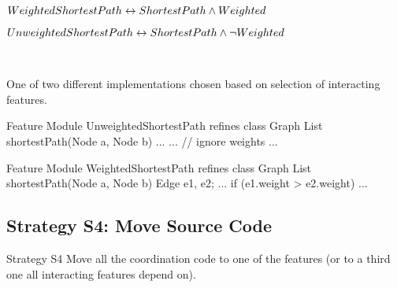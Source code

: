 \begin{frame}[fragile]{\myframetitle}
	\begin{fancycolumns}[widths={55},animation=none]
		{\centering\small

		$WeightedShortestPath \leftrightarrow ShortestPath \wedge Weighted$

		$UnweightedShortestPath \leftrightarrow ShortestPath \wedge \neg Weighted$

		}~
		\begin{note}{}
			One of two different implementations chosen based on selection of interacting features.
		\end{note}
	\nextcolumn
\begin{codetight}{Feature Module UnweightedShortestPath}
refines class Graph {
	List shortestPath(Node a, Node b){
		...
		...
		// ignore weights
		... 
	}
}
\end{codetight}
\begin{codetight}{Feature Module WeightedShortestPath}
refines class Graph {
	List shortestPath(Node a, Node b){
		Edge e1, e2;
		...
		if (e1.weight > e2.weight) 
		... 
	}
}
\end{codetight}	
	\end{fancycolumns}
\end{frame}

\subsection{Strategy S4: Move Source Code}

\begin{frame}{\myframetitle}
	\begin{fancycolumns}[widths={30},animation=none]
		\begin{definition}{Strategy S4}
			Move all the coordination code to one of the features (or to a third one all interacting features depend on).
		\end{definition}
	\nextcolumn
	\end{fancycolumns}
\end{frame}

